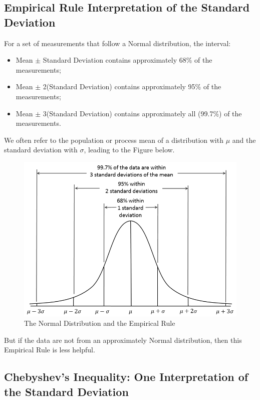 \documentclass[
]{book}
\providecommand{\tightlist}{%
  \setlength{\itemsep}{0pt}\setlength{\parskip}{0pt}}
\begin{document}
\hypertarget{empirical-rule-interpretation-of-the-standard-deviation}{%
\subsection{Empirical Rule Interpretation of the Standard Deviation}\label{empirical-rule-interpretation-of-the-standard-deviation}}

For a set of measurements that follow a Normal distribution, the interval:

\begin{itemize}
\tightlist
\item
  Mean \(\pm\) Standard Deviation contains approximately 68\% of the measurements;
\item
  Mean \(\pm\) 2(Standard Deviation) contains approximately 95\% of the measurements;
\item
  Mean \(\pm\) 3(Standard Deviation) contains approximately all (99.7\%) of the measurements.
\end{itemize}

We often refer to the population or process mean of a distribution with \(\mu\) and the standard deviation with \(\sigma\), leading to the Figure below.

\begin{figure}
\includegraphics[width=0.9\linewidth]{figures/Empirical_Rule} \caption{The Normal Distribution and the Empirical Rule}\label{fig:EmpRule-fig}
\end{figure}

But if the data are not from an approximately Normal distribution, then this Empirical Rule is less helpful.

\hypertarget{chebyshevs-inequality-one-interpretation-of-the-standard-deviation}{%
\subsection{Chebyshev's Inequality: One Interpretation of the Standard Deviation}\label{chebyshevs-inequality-one-interpretation-of-the-standard-deviation}}
\end{document}
